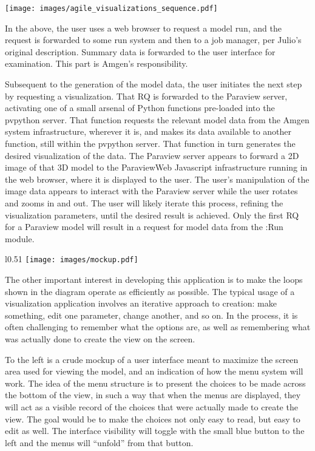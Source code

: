 \documentclass[11pt]{article}
\begin{document}
\hspace{-.5in}
\texttt{[image: images/agile\_visualizations\_sequence.pdf]}

\vspace{-0.4in}

In the above, the user uses a web browser to request a model run,
and the request is forwarded to some run system and then to a job
manager, per Julio's original description.  Summary data is forwarded
to the user interface for examination.  This part is Amgen's
responsibility.

Subsequent to the generation of the model data, the user initiates the
next step by requesting a visualization.  That RQ is forwarded to the
Paraview server, activating one of a small arsenal of Python functions
pre-loaded into the pvpython server.  That function requests the
relevant model data from the Amgen system infrastructure, wherever it
is, and makes its data available to another function, still within the
pvpython server.  That function in turn generates the desired
visualization of the data.  The Paraview server appears to forward a
2D image of that 3D model
to the ParaviewWeb Javascript infrastructure running in the web
browser, where it is displayed to the user.  The user's manipulation
of the image data appears to interact with the Paraview server while
the user rotates and zooms in and out.  The user will likely iterate
this process, refining
the visualization parameters, until the desired result is achieved.
Only the first RQ for a Paraview model will result in a request for
model data from the :Run module.

\newpage


\begin{wrapfigure}{l}{0.51\columnwidth}
\texttt{[image: images/mockup.pdf]}
\end{wrapfigure}

The other important interest in developing this application is to make
the loops shown in the diagram operate as efficiently as possible.
The typical usage of a visualization application involves an iterative
approach to creation: make something, edit one
parameter, change another, and so on.  In the process, it is often
challenging to remember what the options are, as well as remembering
what was actually done to create the view on the screen.

To the left is a crude mockup of a user interface meant to maximize
the screen area used for viewing the model, and an indication of how
the menu system will work.  The idea of the menu structure is to
present the choices to be made across the bottom of the view, in such
a way that when the menus are displayed, they will act as a visible
record of the choices that were actually made to create the view.  The
goal would be to make the choices not only easy to read, but easy to
edit as well. The interface visibility will toggle with the small blue
button to the left and the menus will ``unfold'' from that button.
\end{document}
